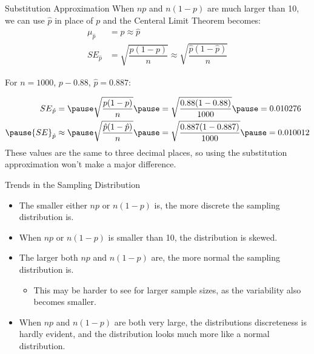\documentclass{beamer}
\begin{document}
\begin{frame}
  \begin{block}{Substitution Approximation}
    When $np$ and $n(1-p)$ are much larger than 10, we can use $\hat{p}$ in place of $p$ and the Centeral Limit Theorem becomes:
    \begin{equation*}
      \begin{aligned}
        \mu_{\hat{p}}&=p\approx \hat{p} \\
        {SE}_{\hat{p}}&=\sqrt{\dfrac{p(1-p)}{n}}\approx \sqrt{\dfrac{\hat{p}(1-\hat{p})}{n}}
      \end{aligned}
    \end{equation*}
  \end{block}\pause

  \begin{example}
    For $n=1000$, $p-0.88$, $\hat{p}=0.887$:

    \vspace{-2mm}
    \begin{equation*}
      \begin{aligned}
        {SE}_{\hat{p}}&=\pause
        \sqrt{\dfrac{p(1-p)}{n}} \pause
        = \sqrt{\dfrac{0.88(1-0.88)}{1000}}\pause
        = 0.010276 \\\pause
        {SE}_{\hat{p}}&\approx \pause
        \sqrt{\dfrac{\hat{p}(1-\hat{p})}{n}}\pause
        = \sqrt{\dfrac{0.887(1-0.887)}{1000}}\pause
        = 0.010012
      \end{aligned}
    \end{equation*}\pause
    These values are the same to three decimal places, so using the substitution approximation won't make a major difference.
  \end{example}
\end{frame}

\begin{frame}
  \begin{block}{Trends in the Sampling Distribution}
    \begin{itemize}
    \item The smaller either $np$ or $n(1-p)$ is, the more discrete the sampling distribution is.\pause
    \item When $np$ or $n(1-p)$ is smaller than 10, the distribution is skewed.\pause
    \item The larger both $np$ and $n(1-p)$ are, the more normal the sampling distribution is.\pause
      \begin{itemize}
      \item This may be harder to see for larger sample sizes, as the variability also becomes smaller.\pause
      \end{itemize}
    \item When $np$ and $n(1-p)$ are both very large, the distributions discreteness is hardly evident, and the distribution looks much more like a normal distribution.
    \end{itemize}
  \end{block}
\end{frame}
\end{document}
